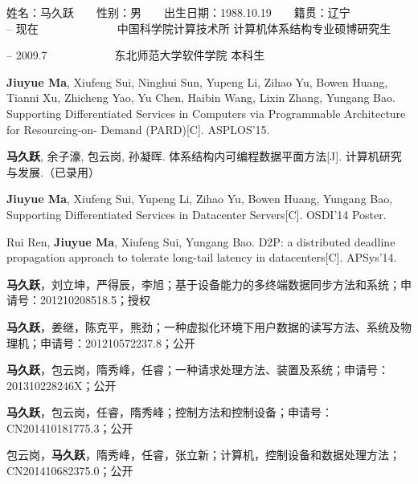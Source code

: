 \begin{resume}

\noindent
姓名：马久跃　　性别：男　　出生日期：1988.10.19　　籍贯：辽宁\\

 -- 现在　　　　　　　中国科学院计算技术所 计算机体系结构专业硕博研究生

 -- 2009.7　　　　　　东北师范大学软件学院 本科生\\

  \begin{enumerate}[leftmargin=1.5\parindent, nolistsep, label={[\arabic*]}]
    \item \textbf{Jiuyue Ma}, Xiufeng Sui, Ninghui Sun, Yupeng Li, Zihao Yu, Bowen Huang, Tianni Xu, Zhicheng Yao, Yu Chen, Haibin Wang, Lixin Zhang, Yungang Bao.
          Supporting Differentiated Services in Computers via Programmable Architecture for Resourcing-on- Demand (PARD)[C]. ASPLOS'15.
    \item \textbf{马久跃}, 余子濠, 包云岗, 孙凝晖. 体系结构内可编程数据平面方法[J]. 计算机研究与发展.（已录用）
    \item \textbf{Jiuyue Ma}, Xiufeng Sui, Yupeng Li, Zihao Yu, Bowen Huang, Yungang Bao, Supporting Differentiated Services in Datacenter Servers[C]. OSDI'14 Poster.
    \item Rui Ren, \textbf{Jiuyue Ma}, Xiufeng Sui, Yungang Bao. D2P: a distributed deadline propagation approach to tolerate long-tail latency in datacenters[C]. APSys'14.
  \end{enumerate}

  \begin{enumerate}[leftmargin=1.5\parindent, nolistsep, label={[\arabic*]}]
    \item \textbf{马久跃}，刘立坤，严得辰，李旭；基于设备能力的多终端数据同步方法和系统；申请号：201210208518.5；授权
    \item \textbf{马久跃}，姜继，陈克平，熊劲；一种虚拟化环境下用户数据的读写方法、系统及物理机；申请号：201210572237.8；公开
    \item \textbf{马久跃}，包云岗，隋秀峰，任睿；一种请求处理方法、装置及系统；申请号：201310228246X；公开
    \item \textbf{马久跃}，包云岗，任睿，隋秀峰；控制方法和控制设备；申请号：CN201410181775.3；公开
    \item 包云岗，\textbf{马久跃}，隋秀峰，任睿，张立新；计算机，控制设备和数据处理方法；CN201410682375.0；公开
  \end{enumerate}


\end{resume}
